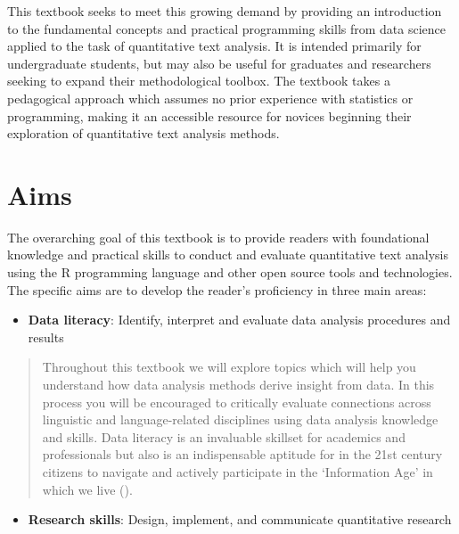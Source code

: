 \documentclass[
  letterpaper,
  DIV=11,
  numbers=noendperiod]{scrreprt}
\providecommand{\tightlist}{%
  \setlength{\itemsep}{0pt}\setlength{\parskip}{0pt}}\usepackage{longtable,booktabs,array}
\theoremstyle{definition}
\theoremstyle{remark}
\begin{document}
This textbook seeks to meet this growing demand by providing an
introduction to the fundamental concepts and practical programming
skills from data science applied to the task of quantitative text
analysis. It is intended primarily for undergraduate students, but may
also be useful for graduates and researchers seeking to expand their
methodological toolbox. The textbook takes a pedagogical approach which
assumes no prior experience with statistics or programming, making it an
accessible resource for novices beginning their exploration of
quantitative text analysis methods.

\section*{Aims}\label{sec-p-aims}


The overarching goal of this textbook is to provide readers with
foundational knowledge and practical skills to conduct and evaluate
quantitative text analysis using the R programming language and other
open source tools and technologies. The specific aims are to develop the
reader's proficiency in three main areas:

\begin{itemize}
\tightlist
\item
  \textbf{Data literacy}: Identify, interpret and
  evaluate data analysis procedures and results
\end{itemize}

\begin{quote}
Throughout this textbook we will explore topics which will help you
understand how data analysis methods derive insight from data. In this
process you will be encouraged to critically evaluate connections across
linguistic and language-related disciplines using data analysis
knowledge and skills. Data literacy is an invaluable skillset for
academics and professionals but also is an indispensable aptitude for in
the 21st century citizens to navigate and actively participate in the
`Information Age' in which we live ().
\end{quote}

\begin{itemize}
\tightlist
\item
  \textbf{Research skills}: Design, implement, and communicate
  quantitative research
\end{itemize}
\end{document}
